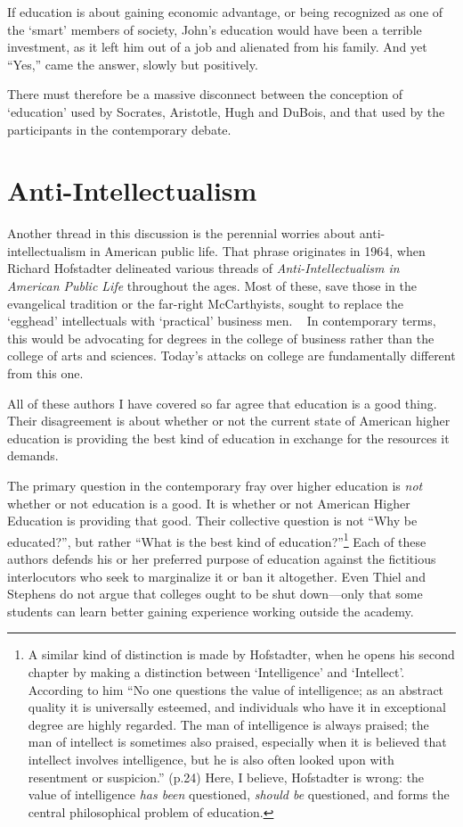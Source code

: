 If education is about gaining economic advantage, or being recognized as one of the `smart' members of society, John's education would have been a terrible investment, as it left him out of a job and alienated from his family. And yet ``Yes,'' came the answer, slowly but positively.

There must therefore be a massive disconnect between the conception of `education' used by Socrates, Aristotle, Hugh and DuBois, and that used by the participants in the contemporary debate. 

\section{Anti-Intellectualism}
\label{anti-intellectualism}

Another thread in this discussion is the perennial worries about anti-intellectualism in American public life. That phrase originates in 1964, when Richard Hofstadter delineated various threads of \emph{Anti-Intellectualism in American Public Life} throughout the ages. Most of these, save those in the evangelical tradition or the far-right McCarthyists, sought to replace the `egghead' intellectuals with `practical' business men. ~\citep{Hofstadter:1966td} In contemporary terms, this would be advocating for degrees in the college of business rather than the college of arts and sciences. Today's attacks on college are fundamentally different from this one.

All of these authors I have covered so far agree that education is a good thing. Their disagreement is about whether or not the current state of American higher education is providing the best kind of education in exchange for the resources it demands. 

The primary question in the contemporary fray over higher education is \emph{not} whether or not education is a good. It is whether or not American Higher Education is providing that good. Their collective question is not ``Why be educated?'', but rather ``What is the best kind of education?''\footnote{A similar kind of distinction is made by Hofstadter, when he opens his second chapter by making a distinction between `Intelligence' and `Intellect'. According to him ``No one questions the value of intelligence; as an abstract quality it is universally esteemed, and individuals who have it in exceptional degree are highly regarded. The man of intelligence is always praised; the man of intellect is sometimes also praised, especially when it is believed that intellect involves intelligence, but he is also often looked upon with resentment or suspicion.'' (p.24)
Here, I believe, Hofstadter is wrong: the value of intelligence \emph{has been} questioned, \emph{should be} questioned, and forms the central philosophical problem of education.} Each of these authors defends his or her preferred purpose of education against the fictitious interlocutors who seek to marginalize it or ban it altogether. Even Thiel and Stephens do not argue that colleges ought to be shut down---only that some students can learn better gaining experience working outside the academy. 

